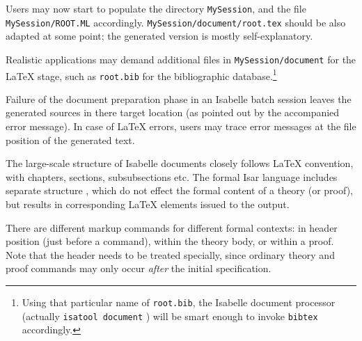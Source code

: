 \begin{isabellebody}
\begin{isamarkuptext}
  \medskip Users may now start to populate the directory
  \texttt{MySession}, and the file \texttt{MySession/ROOT.ML}
  accordingly.  \texttt{MySession/document/root.tex} should be also
  adapted at some point; the generated version is mostly
  self-explanatory.

  Realistic applications may demand additional files in
  \texttt{MySession/document} for the {\LaTeX} stage, such as
  \texttt{root.bib} for the bibliographic database.\footnote{Using
  that particular name of \texttt{root.bib}, the Isabelle document
  processor (actually \texttt{isatool document} \cite{isabelle-sys})
  will be smart enough to invoke \texttt{bibtex} accordingly.}

  \medskip Failure of the document preparation phase in an Isabelle
  batch session leaves the generated sources in there target location
  (as pointed out by the accompanied error message).  In case of
  {\LaTeX} errors, users may trace error messages at the file position
  of the generated text.%
\end{isamarkuptext}%
\isamarkuptrue%
%
\isamarkuptrue%
%
\isamarkuptrue%
%
\begin{isamarkuptext}%
The large-scale structure of Isabelle documents closely follows
  {\LaTeX} convention, with chapters, sections, subsubsections etc.
  The formal Isar language includes separate structure , which do not effect the formal content of a theory (or
  proof), but results in corresponding {\LaTeX} elements issued to the
  output.

  There are different markup commands for different formal contexts:
  in header position (just before a  command),
  within the theory body, or within a proof.  Note that the header
  needs to be treated specially, since ordinary theory and proof
  commands may only occur \emph{after} the initial 
  specification.

  \smallskip


\end{isamarkuptext}
\end{isabellebody}
